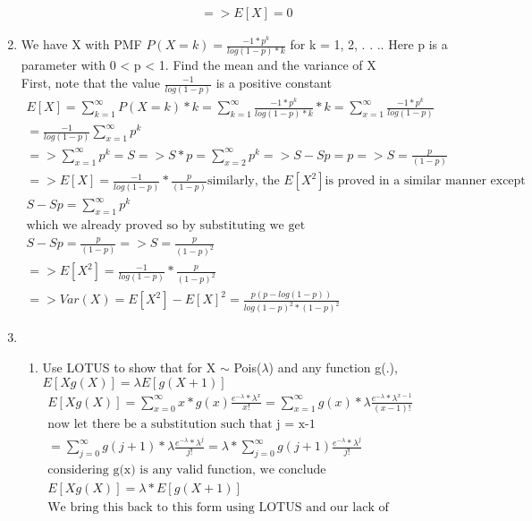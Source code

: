 \documentclass[11pt]{article}
\begin{document}
\begin{enumerate}
\begin{enumerate}
\begin{gather}
		=> E[X] = 0
	\end{gather}
\end{enumerate}
\item We have X with PMF $P(X = k) = \frac{-1*p^k}{log(1-p)*k}$
for k = 1, 2, . . .. Here p is a parameter with 0 < p < 1. Find the mean and the variance of X
\\
First, note that the value $\frac{-1}{log(1-p)}$ is a positive constant
\begin{gather}
	E[X] = \sum_{k=1}^{\infty} P(X=k)*k = \sum_{k=1}^{\infty} \frac{-1*p^k}{log(1-p)*k} * k = \sum_{x=1}^{\infty} \frac{-1*p^k}{log(1-p)} \\ 
	= \frac{-1}{log(1-p)} \sum_{x=1}^{\infty} p^k \\
	=> \sum_{x=1}^{\infty} p^k = S => S*p = \sum_{x=2}^{\infty} p^k => S-Sp = p => S= \frac{p}{(1-p)}\\
	=> E[X] = \frac{-1}{log(1-p)} * \frac{p}{(1-p)}
	\text{similarly, the }E[X^2] \text{is proved in a similar manner except} \\
	S-Sp = \sum_{x=1}^{\infty} p^k \\
	\text{which we already proved so by substituting we get}\\
	S-Sp =  \frac{p}{(1-p)} => S = \frac{p}{(1-p)^2}\\
	=> E[X^2] = \frac{-1}{log(1-p)} * \frac{p}{(1-p)^2}\\
	=>Var(X) = E[X^2]-E[X]^2 = \frac{p(p-log(1-p))}{log(1-p)^2*(1-p)^2}
\end{gather}	
\item
\begin{enumerate}
	\item  Use LOTUS to show that for X $\sim$ Pois($\lambda$) and any function g(.), $E[Xg(X)] = \lambda E[g(X+1)]$
	\begin{gather}
		E[Xg(X)] = \sum_{x=0}^{\infty} x*g(x) \frac{e^{-\lambda} * \lambda ^ x}{x!} = \sum_{x=1}^{\infty} g(x)*\lambda \frac{e^{-\lambda} * \lambda ^{x-1}}{(x-1)!} \\
		\text{now let there be a substitution such that j = x-1}\\
		= \sum_{j=0}^{\infty} g(j+1)*\lambda \frac{e^{-\lambda} * \lambda ^{j}}{j!} =  \lambda * \sum_{j=0}^{\infty} g(j+1) \frac{e^{-\lambda} * \lambda ^{j}}{j!} \\
		\text{considering g(x) is any valid function, we conclude}\\
		E[Xg(X)] = \lambda * E[g(X+1)] \\
		\text{We bring this back to this form using LOTUS and our lack of knowledge on g(x)}

\end{gather}
\end{enumerate}
\end{enumerate}
\end{document}
